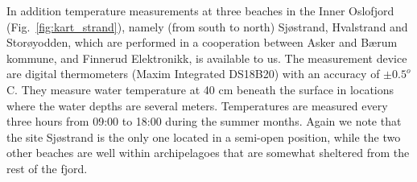 

In addition temperature measurements at three beaches in the Inner Oslofjord (Fig.~\ref{fig:kart_strand}), namely (from south to north) Sj{\o}strand, Hvalstrand and Stor{\o}yodden, which are performed in a cooperation between Asker and B{\ae}rum kommune, and Finnerud Elektronikk, is available to us. The measurement device are digital thermometers (Maxim Integrated DS18B20) with an accuracy of $\pm 0.5^o$C. They measure water temperature at 40 cm beneath the surface in locations where the water depths are several meters. Temperatures are measured every three hours from 09:00 to 18:00 during the summer months. Again we note that the site Sj{\o}strand is the only one located in a semi-open position, while the two other beaches are well within archipelagoes that are somewhat sheltered from the rest of the fjord.

